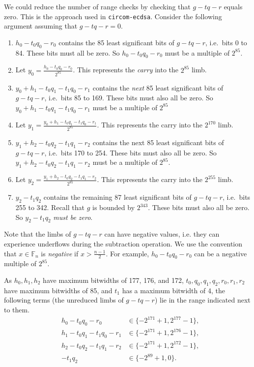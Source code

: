 \documentclass[a4paper, 12pt]{article}
\begin{document}
We could reduce the number of range checks by checking that $g-tq-r$ equals zero. This is the approach used in \texttt{circom-ecdsa}. Consider the following argument assuming that $g-tq-r = 0$.
\begin{enumerate}
  \item $h_0-t_0q_0-r_0$ contains the 85 least significant bits of $g-tq-r$, i.e.~bits 0 to 84. These bits must all be zero. So $h_0-t_0q_0-r_0$ must be a multiple of $2^{85}$. 
  \item Let $y_0 = \frac{h_0-t_0q_0-r_0}{2^{85}}$. This represents the \textit{carry} into the $2^{85}$ limb.
  \item $y_0+h_1-t_0q_1-t_1q_0-r_1$ contains the \textit{next} 85 least significant bits of $g-tq-r$, i.e.~bits 85 to 169. These bits must also all be zero. So $y_0+h_1-t_0q_1-t_1q_0-r_1$ must be a multiple of $2^{85}$
  \item Let $y_1 = \frac{y_0+h_1-t_0q_1-t_1q_0-r_1}{2^{85}}$. This represents the carry into the $2^{170}$ limb.
  \item $y_1+h_2-t_0q_2-t_1q_1-r_2$ contains the next 85 least significant bits of $g-tq-r$, i.e.~bits 170 to 254. These bits must also all be zero. So $y_1+h_2-t_0q_2-t_1q_1-r_2$ must be a multiple of $2^{85}$.
  \item Let $y_2 = \frac{y_1+h_2-t_0q_2-t_1q_1-r_2}{2^{85}}$. This represents the carry into the $2^{255}$ limb.
  \item $y_2-t_1q_2$ contains the remaining 87 least significant bits of $g-tq-r$, i.e.~bits 255 to 342. Recall that $g$ is bounded by $2^{343}$. These bits must also all be zero. So $y_2-t_1q_2$ \textit{must be zero}.
\end{enumerate}

Note that the limbs of $g-tq-r$ can have negative values, i.e. they can experience underflows during the subtraction operation. We use the convention that $x \in \mathbb{F}_n$ is \textit{negative} if $x > \frac{n-1}{2}$.  For example, $h_0-t_0q_0-r_0$ can be a negative multiple of $2^{85}$.

As $h_0, h_1, h_2$ have maximum bitwidths of 177, 176, and 172, $t_0, q_0, q_1, q_2, r_0, r_1, r_2$ have maximum bitwidths of 85, and $t_1$ has a maximum bitwidth of 4, the following terms (the unreduced limbs of $g-tq-r$) lie in the range indicated next to them.
\begin{align*}
  & h_0 - t_0q_0-r_0 & \in \{-2^{171}+1, 2^{177}-1\},\\
  & h_1 - t_0q_1-t_1q_0-r_1 & \in \{-2^{171}+1, 2^{176}-1\},\\
  & h_2 - t_0q_2-t_1q_1-r_2 & \in \{-2^{171}+1, 2^{172}-1\},\\
  & - t_1q_2 & \in \{-2^{89}+1,0\}.
\end{align*}
\end{document}
